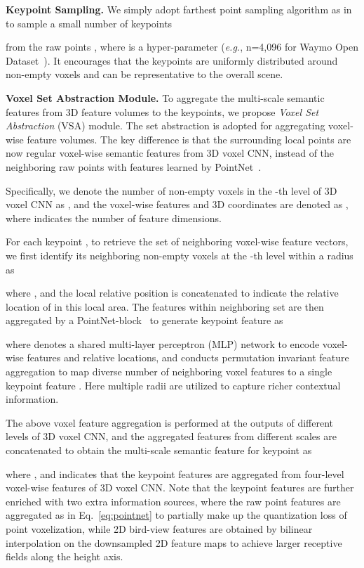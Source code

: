 \documentclass[natbib,twocolumn]{svjour3}          \smartqed  \usepackage{graphicx}
\begin{document}
\noindent
\textbf{Keypoint Sampling.} 
We simply adopt farthest point sampling algorithm as in~\citep{qi2017pointnet++} to sample a small number of keypoints 
 
from the raw points , where  is 
a hyper-parameter 
(\emph{e.g.}, n=4,096 for Waymo Open Dataset~\citep{Sun_2020_CVPR}).
It encourages that the keypoints are uniformly distributed around non-empty voxels and can be representative to the overall scene.

\noindent
\textbf{Voxel Set Abstraction Module.}
To aggregate the multi-scale semantic features from 3D feature volumes to the keypoints, we propose \textit{Voxel Set Abstraction} (VSA) module.
The set abstraction \citep{qi2017pointnet++} is adopted for aggregating voxel-wise feature volumes. 
The key difference is that the surrounding local points are now regular voxel-wise semantic features from 3D voxel CNN, instead of the neighboring raw points with features learned by PointNet~\citep{qi2017pointnet}.

Specifically, we denote the number of non-empty voxels in the -th level of 3D voxel CNN as , and the voxel-wise features and 3D coordinates are denoted as 
, where  indicates the number of feature dimensions.

For each keypoint , to retrieve the set of neighboring voxel-wise feature vectors, we first identify its neighboring non-empty voxels at the -th level within a radius  as

where , 
and the local relative position   is concatenated to indicate the relative location of  in this local area.
The features within neighboring set  are then aggregated by a PointNet-block~\citep{qi2017pointnet} to generate keypoint  feature as


\noindent 
where  denotes a shared multi-layer perceptron (MLP) network to encode voxel-wise features and relative locations, and  conducts permutation invariant feature aggregation to 
map diverse number of neighboring voxel features to a single keypoint feature .
Here multiple radii are utilized to capture richer contextual information. 

The above voxel feature aggregation is performed at the outputs of different levels of 3D voxel CNN, and the aggregated features from different scales are concatenated to obtain the multi-scale semantic feature for keypoint  as 

where , and  indicates that the keypoint features are aggregated from four-level voxel-wise features  of 3D voxel CNN. 
Note that the keypoint features are further enriched with two extra information sources, where the raw point features  are aggregated as in Eq.~\eqref{eq:pointnet} to partially make up the quantization loss of point voxelization, while 2D bird-view features  are obtained by bilinear interpolation on the  downsampled 2D feature maps to achieve larger receptive fields along the height axis.
\end{document}
